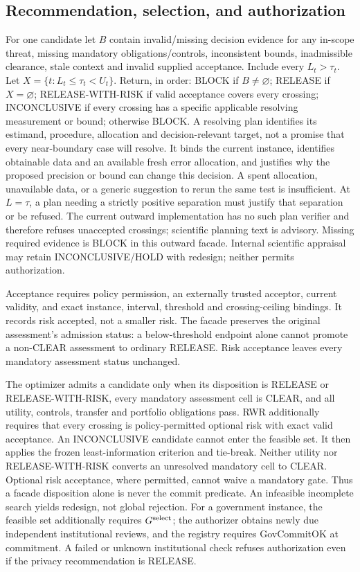 \subsection{Recommendation, selection, and authorization}
For one candidate let $B$ contain invalid/missing decision evidence for any
in-scope threat, missing mandatory obligations/controls, inconsistent bounds,
inadmissible clearance, stale context and invalid supplied acceptance.
Include every $L_t>\tau_t$. Let $X=\{t:L_t\le\tau_t<U_t\}$. Return, in order:
BLOCK if $B\ne\varnothing$; RELEASE if $X=\varnothing$;
RELEASE-WITH-RISK if valid acceptance covers every crossing;
INCONCLUSIVE if every crossing has a specific applicable resolving
measurement or bound; otherwise BLOCK.
A resolving plan identifies its estimand, procedure, allocation and
decision-relevant target, not a promise that every near-boundary case will
resolve. It binds the current instance, identifies obtainable data and an
available fresh error allocation, and justifies why the proposed precision or
bound can change this decision. A spent allocation, unavailable data, or a
generic suggestion to rerun the same test is insufficient. At $L=\tau$, a
plan needing a strictly positive separation must justify that separation or
be refused. The current outward implementation has no such plan verifier and
therefore refuses unaccepted crossings; scientific planning text is advisory.
Missing required evidence is BLOCK in this outward facade. Internal
scientific appraisal may retain INCONCLUSIVE/HOLD with redesign; neither
permits authorization.

Acceptance requires policy permission, an externally trusted acceptor,
current validity, and exact instance, interval, threshold and crossing-ceiling
bindings. It records risk accepted, not a smaller risk. The facade preserves
the original assessment's admission status: a below-threshold endpoint alone
cannot promote a non-CLEAR assessment to ordinary RELEASE. Risk acceptance
leaves every mandatory assessment status unchanged.

The optimizer admits a candidate only when its disposition is RELEASE or
RELEASE-WITH-RISK, every mandatory assessment cell is CLEAR, and all utility,
controls, transfer and portfolio obligations pass. RWR additionally requires
that every crossing is policy-permitted optional risk with exact valid
acceptance. An INCONCLUSIVE candidate cannot enter the feasible set.
It then applies the frozen least-information criterion and tie-break.
Neither utility nor RELEASE-WITH-RISK converts an unresolved mandatory cell
to CLEAR. Optional risk acceptance, where permitted, cannot waive a mandatory
gate. Thus a facade disposition alone is never the commit predicate.
An infeasible incomplete search yields redesign, not global rejection.
For a government instance, the feasible set additionally requires
$G^{\rm select}$; the authorizer obtains newly due independent institutional
reviews, and the registry requires GovCommitOK at commitment. A failed or
unknown institutional check refuses authorization even if the privacy
recommendation is RELEASE.

